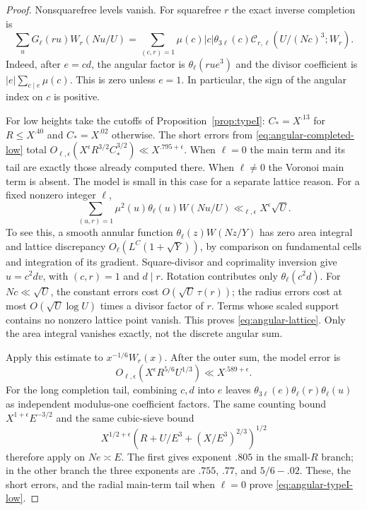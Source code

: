 \begin{proof}
Nonsquarefree levels vanish. For squarefree $r$ the exact inverse
completion is
\begin{equation}
 \sum_u G_\ell(ru)W_r(Nu/U)
 =\sum_{(c,r)=1}\mu(c)|c|\theta_{3\ell}(c)
       \mathcal C_{r,\ell}(U/(Nc)^3;W_r).
 \label{eq:angular-inversion}
\end{equation}
Indeed, after $e=cd$, the angular factor is
$\theta_\ell(rue^3)$ and the divisor coefficient is
$|e|\sum_{c\mid e}\mu(c)$. This is zero unless $e=1$.
In particular, the sign of the angular index on $c$ is positive.

For low heights take the cutoffs of Proposition~\ref{prop:typeI}:
$C_*=X^{.13}$ for $R\le X^{.40}$ and $C_*=X^{.02}$ otherwise.
The short errors from \eqref{eq:angular-completed-low} total
$O_{\ell,\epsilon}(X^\epsilon R^{3/2}C_*^{3/2})
 \ll X^{.795+\epsilon}$.
When $\ell=0$ the main term and its tail are exactly those already
computed there. When $\ell\ne0$ the Voronoi main term is absent.
The model is small in this case for a separate lattice reason.
For a fixed nonzero integer $\ell$,
\begin{equation}
 \sum_{(u,r)=1}\mu^2(u)\theta_\ell(u)W(Nu/U)
       \ll_{\ell,\epsilon}X^\epsilon\sqrt U.
 \label{eq:angular-lattice}
\end{equation}
To see this, a smooth annular function
$\theta_\ell(z)W(Nz/Y)$ has zero area integral and lattice
discrepancy $O_\ell(L^C(1+\sqrt Y))$, by comparison on fundamental
cells and integration of its gradient. Square-divisor and
coprimality inversion give $u=c^2dv$, with $(c,r)=1$ and $d\mid r$.
Rotation contributes only $\theta_\ell(c^2d)$. For
$Nc\ll\sqrt U$, the constant errors cost
$O(\sqrt U\,\tau(r))$; the radius errors cost at most
$O(\sqrt U\log U)$ times a divisor factor of $r$.
Terms whose scaled support contains no nonzero lattice point vanish.
This proves \eqref{eq:angular-lattice}. Only the area integral
vanishes exactly, not the discrete angular sum.

Apply this estimate to $x^{-1/6}W_r(x)$. After the outer sum, the
model error is
\[
 O_{\ell,\epsilon}(X^\epsilon R^{5/6}U^{1/3})
       \ll X^{.589+\epsilon}.
\]
For the long completion tail, combining $c,d$ into $e$ leaves
$\theta_{3\ell}(e)\theta_\ell(r)\theta_\ell(u)$ as independent
modulus-one coefficient factors. The same counting bound
$X^{1+\epsilon}E^{-3/2}$ and the same cubic-sieve bound
\[
 X^{1/2+\epsilon}
       \left(R+U/E^3+(X/E^3)^{2/3}\right)^{1/2}
\]
therefore apply on $Ne\asymp E$. The first gives exponent $.805$
in the small-$R$ branch; in the other branch the three exponents
are $.755$, $.77$, and $5/6-.02$. These, the short errors, and the
radial main-term tail when $\ell=0$ prove
\eqref{eq:angular-typeI-low}.


\end{proof}
